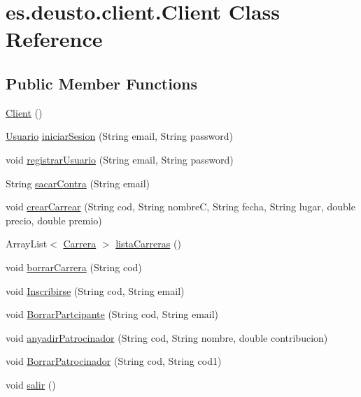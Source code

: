\hypertarget{classes_1_1deusto_1_1client_1_1_client}{}\section{es.\+deusto.\+client.\+Client Class Reference}
\label{classes_1_1deusto_1_1client_1_1_client}
\subsection*{Public Member Functions}
\begin{DoxyCompactItemize}
\item 
\mbox{\hyperlink{classes_1_1deusto_1_1client_1_1_client_a71c03e318a72447da873297f3364f67f}{Client}} ()
\item 
\mbox{\hyperlink{classes_1_1deusto_1_1server_1_1jdo_1_1_usuario}{Usuario}} \mbox{\hyperlink{classes_1_1deusto_1_1client_1_1_client_a4cc1480125fa35b37c37e8e1e79d91f6}{iniciar\+Sesion}} (String email, String password)
\item 
void \mbox{\hyperlink{classes_1_1deusto_1_1client_1_1_client_a6f2674bcf110140f6a0c146f95c7e182}{registrar\+Usuario}} (String email, String password)
\item 
String \mbox{\hyperlink{classes_1_1deusto_1_1client_1_1_client_a6ce290f27e4f39f9493799cbc6112cc5}{sacar\+Contra}} (String email)
\item 
void \mbox{\hyperlink{classes_1_1deusto_1_1client_1_1_client_a0efc9ad350a61ae5277827eb1964b890}{crear\+Carrear}} (String cod, String nombreC, String fecha, String lugar, double precio, double premio)
\item 
Array\+List$<$ \mbox{\hyperlink{classes_1_1deusto_1_1server_1_1jdo_1_1_carrera}{Carrera}} $>$ \mbox{\hyperlink{classes_1_1deusto_1_1client_1_1_client_abf1f982fbf3beeaba8bdcf66a50cb489}{lista\+Carreras}} ()
\item 
void \mbox{\hyperlink{classes_1_1deusto_1_1client_1_1_client_aff43677afc5d700af05c4cd6df9abd67}{borrar\+Carrera}} (String cod)
\item 
void \mbox{\hyperlink{classes_1_1deusto_1_1client_1_1_client_adbe22bb52fdcd07747e848fb6f73d73d}{Inscribirse}} (String cod, String email)
\item 
void \mbox{\hyperlink{classes_1_1deusto_1_1client_1_1_client_aea291d51922d4526e50fc57eed4a00cb}{Borrar\+Partcipante}} (String cod, String email)
\item 
void \mbox{\hyperlink{classes_1_1deusto_1_1client_1_1_client_a7023d196eb023c279e693048e53e2116}{anyadir\+Patrocinador}} (String cod, String nombre, double contribucion)
\item 
void \mbox{\hyperlink{classes_1_1deusto_1_1client_1_1_client_a732af230162daf8e856ca9350ebe918a}{Borrar\+Patrocinador}} (String cod, String cod1)
\item 
void \mbox{\hyperlink{classes_1_1deusto_1_1client_1_1_client_ac6d57dc4fbeeef9d6d60637c4e1bd1c6}{salir}} ()
\end{DoxyCompactItemize}
